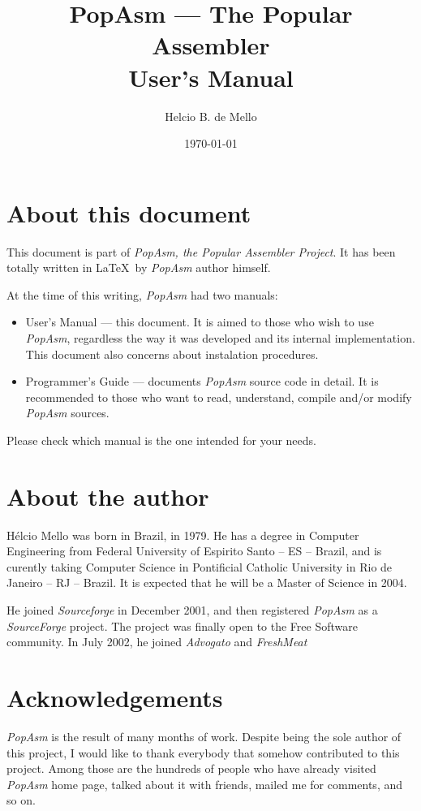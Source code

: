 \documentclass[a4paper,12pt]{book}
\title{PopAsm --- The Popular Assembler\\User's Manual}
\author{Helcio B. de Mello}
\date{\today}
\begin{document}
\maketitle

\chapter*{About this document}
This document is part of \emph{PopAsm, the Popular Assembler Project}. It has been totally written in \LaTeX\ by
\emph{PopAsm} author himself.

At the time of this writing, \emph{PopAsm} had two manuals:

\begin{itemize}
	\item{User's Manual} --- this document. It is aimed to those who wish to use \emph{PopAsm}, regardless the way
		it was developed and its internal implementation. This document also concerns about instalation procedures.
	\item{Programmer's Guide} --- documents \emph{PopAsm} source code in detail. It is recommended to those who
		want to read, understand, compile and/or modify \emph{PopAsm} sources.
\end{itemize}

Please check which manual is the one intended for your needs.

\chapter*{About the author}
H\'elcio Mello was born in Brazil, in 1979. He has a degree in Computer Engineering from Federal University of
Espirito Santo -- ES -- Brazil\cite{UFES}, and is curently taking Computer Science in Pontificial Catholic
University in Rio de Janeiro -- RJ -- Brazil\cite{PUC}. It is expected that he will be a Master of Science in 2004.

He joined \emph{Sourceforge}\cite{SF} in December 2001, and then registered \emph{PopAsm} as a \emph{SourceForge}
project. The project was finally open to the Free Software community. In July 2002, he joined \emph{Advogato}
\cite{ADV}\cite{ADVPRSN} and \emph{FreshMeat}\cite{FRESH}

\chapter*{Acknowledgements}
\emph{PopAsm} is the result of many months of work. Despite being the sole author of this project, I would like to
thank everybody that somehow contributed to this project. Among those are the hundreds of people who have already
visited \emph{PopAsm} home page, talked about it with friends, mailed me for comments, and so on.
\end{document}

